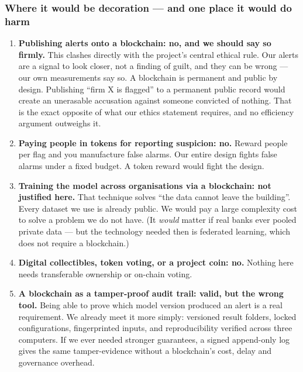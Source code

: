 \documentclass[11pt,a4paper]{article}
\begin{document}
\subsubsection*{Where it would be decoration --- and one place it would do harm}

\begin{enumerate}
  \item \textbf{Publishing alerts onto a blockchain: no, and we should say so
        firmly.} This clashes directly with the project's central ethical rule.
        Our alerts are a signal to look closer, not a finding of guilt, and they
        can be wrong --- our own measurements say so. A blockchain is permanent and
        public by design. Publishing ``firm X is flagged'' to a permanent public
        record would create an unerasable accusation against someone convicted of
        nothing. That is the exact opposite of what our ethics statement requires,
        and no efficiency argument outweighs it.
  \item \textbf{Paying people in tokens for reporting suspicion: no.} Reward people
        per flag and you manufacture false alarms. Our entire design fights false
        alarms under a fixed budget. A token reward would fight the design.
  \item \textbf{Training the model across organisations via a blockchain: not
        justified here.} That technique solves ``the data cannot leave the
        building''. Every dataset we use is already public. We would pay a large
        complexity cost to solve a problem we do not have. (It \emph{would} matter
        if real banks ever pooled private data --- but the technology needed then
        is federated learning, which does not require a blockchain.)
  \item \textbf{Digital collectibles, token voting, or a project coin: no.} Nothing
        here needs transferable ownership or on-chain voting.
  \item \textbf{A blockchain as a tamper-proof audit trail: valid, but the wrong
        tool.} Being able to prove which model version produced an alert is a real
        requirement. We already meet it more simply: versioned result folders,
        locked configurations, fingerprinted inputs, and reproducibility verified
        across three computers. If we ever needed stronger guarantees, a signed
        append-only log gives the same tamper-evidence without a blockchain's
        cost, delay and governance overhead.
\end{enumerate}
\end{document}
